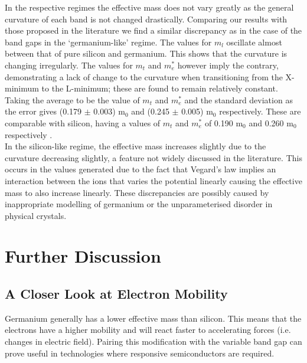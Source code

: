 \documentclass[10pt, twocolumn]{revtex4}    %
\begin{document}
In the respective regimes the effective mass does not vary greatly as the general curvature of each band is not changed drastically. Comparing our results with those proposed in the literature we find a similar discrepancy as in the case of the band gaps in the `germanium-like' regime. The values for $m_l$ oscillate almost between that of pure silicon and germanium. This shows that the curvature is changing irregularly. The values for $m_t$ and $m_e^*$ however imply the contrary, demonstrating a lack of change to the curvature when transitioning from the X-minimum to the L-minimum; these are found to remain relatively constant. Taking the average to be the value of $m_t$ and $m_e^*$ and the standard deviation as the error gives (0.179 $\pm$ 0.003) m$_0$ and (0.245 $\pm$ 0.005) m$_0$ respectively. These are comparable with silicon, having a values of $m_t$ and $m_e^*$ of  0.190 m$_0$ and 0.260 m$_0$ respectively \cite{ref04}. \\

In the silicon-like regime, the effective mass increases slightly due to the curvature decreasing slightly, a feature not widely discussed in the literature. This occurs in the values generated due to the fact that Vegard's law implies an interaction between the ions that varies the potential linearly causing the effective mass to also increase linearly. These discrepancies are possibly caused by inappropriate modelling of germanium or the unparameterised disorder in physical crystals.


\section{Further Discussion}

\subsection{A Closer Look at Electron Mobility}
Germanium generally has a lower effective mass than silicon. This means that the electrons have a higher mobility and will react faster to accelerating forces (i.e. changes in electric field). Pairing this modification with the variable band gap can prove useful in technologies where responsive semiconductors are required.\\
\end{document}
